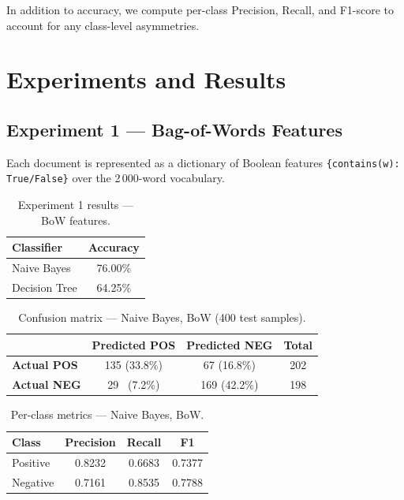 \documentclass[11pt,a4paper]{article}
\begin{document}
In addition to accuracy, we compute per-class Precision, Recall, and F1-score to
account for any class-level asymmetries.

\section{Experiments and Results}

\subsection{Experiment 1 --- Bag-of-Words Features}

Each document is represented as a dictionary of Boolean features
\texttt{\{contains(w): True/False\}} over the 2\,000-word vocabulary.

\begin{table}[H]
  \centering
  \caption{Experiment 1 results --- BoW features.}
  \label{tab:exp1}
  \begin{tabular}{lc}
    \toprule
    \textbf{Classifier} & \textbf{Accuracy} \\
    \midrule
    Naive Bayes   & 76.00\% \\
    Decision Tree & 64.25\% \\
    \bottomrule
  \end{tabular}
\end{table}

\begin{table}[H]
  \centering
  \caption{Confusion matrix --- Naive Bayes, BoW (400 test samples).}
  \label{tab:cm1}
  \begin{tabular}{lccc}
    \toprule
    & \textbf{Predicted POS} & \textbf{Predicted NEG} & \textbf{Total} \\
    \midrule
    \textbf{Actual POS} & 135 (33.8\%) & 67 (16.8\%) & 202 \\
    \textbf{Actual NEG} &  29 \ (7.2\%)& 169 (42.2\%)& 198 \\
    \bottomrule
  \end{tabular}
\end{table}

\begin{table}[H]
  \centering
  \caption{Per-class metrics --- Naive Bayes, BoW.}
  \label{tab:metrics1}
  \begin{tabular}{lccc}
    \toprule
    \textbf{Class} & \textbf{Precision} & \textbf{Recall} & \textbf{F1} \\
    \midrule
    Positive & 0.8232 & 0.6683 & 0.7377 \\
    Negative & 0.7161 & 0.8535 & 0.7788 \\
    \bottomrule
  \end{tabular}
\end{table}
\end{document}

